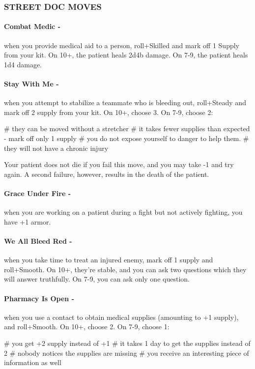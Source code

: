 \subsubsection{STREET DOC MOVES}
\paragraph{Combat Medic -} when you provide medical aid to a person, roll+Skilled and mark off 1 Supply from your kit. On 10+, the patient heals 2d4b damage. On 7-9, the patient heals 1d4 damage.

\paragraph{Stay With Me -} when you attempt to stabilize a teammate who is bleeding out, roll+Steady and mark off 2 supply from your kit. On 10+, choose 3. On 7-9, choose 2:
    \begin{easylist}
        # they can be moved without a stretcher
        # it takes fewer supplies than expected - mark off only 1 supply
        # you do not expose yourself to danger to help them.
        # they will not have a chronic injury
    \end{easylist}
Your patient does not die if you fail this move, and you may take -1 and try again. A second failure, however, results in the death of the patient.

\paragraph{Grace Under Fire -} when you are working on a patient during a fight but not actively fighting, you have +1 armor.

\paragraph{We All Bleed Red -} when you take time to treat an injured enemy, mark off 1 supply and roll+Smooth. On 10+, they’re stable, and you can ask two questions which they will answer truthfully. On 7-9, you can ask only one question.

\paragraph{Pharmacy Is Open -} when you use a contact to obtain medical supplies (amounting to +1 supply), and roll+Smooth. On 10+, choose 2. On 7-9, choose 1:
    \begin{easylist}
        # you get +2 supply instead of +1
        # it takes 1 day to get the supplies instead of 2
        # nobody notices the supplies are missing
        # you receive an interesting piece of information as well
    \end{easylist}

